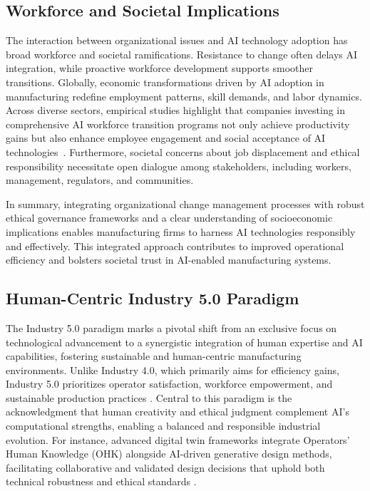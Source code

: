 \documentclass[sigconf]{acmart}
\begin{document}
\subsection{Workforce and Societal Implications}

The interaction between organizational issues and AI technology adoption has broad workforce and societal ramifications. Resistance to change often delays AI integration, while proactive workforce development supports smoother transitions. Globally, economic transformations driven by AI adoption in manufacturing redefine employment patterns, skill demands, and labor dynamics. Across diverse sectors, empirical studies highlight that companies investing in comprehensive AI workforce transition programs not only achieve productivity gains but also enhance employee engagement and social acceptance of AI technologies~\cite{}. Furthermore, societal concerns about job displacement and ethical responsibility necessitate open dialogue among stakeholders, including workers, management, regulators, and communities.

In summary, integrating organizational change management processes with robust ethical governance frameworks and a clear understanding of socioeconomic implications enables manufacturing firms to harness AI technologies responsibly and effectively. This integrated approach contributes to improved operational efficiency and bolsters societal trust in AI-enabled manufacturing systems.

\subsection{Human-Centric Industry 5.0 Paradigm}

The Industry 5.0 paradigm marks a pivotal shift from an exclusive focus on technological advancement to a synergistic integration of human expertise and AI capabilities, fostering sustainable and human-centric manufacturing environments. Unlike Industry 4.0, which primarily aims for efficiency gains, Industry 5.0 prioritizes operator satisfaction, workforce empowerment, and sustainable production practices \cite{ref2}. Central to this paradigm is the acknowledgment that human creativity and ethical judgment complement AI’s computational strengths, enabling a balanced and responsible industrial evolution. For instance, advanced digital twin frameworks integrate Operators’ Human Knowledge (OHK) alongside AI-driven generative design methods, facilitating collaborative and validated design decisions that uphold both technical robustness and ethical standards \cite{ref14}.
\end{document}
